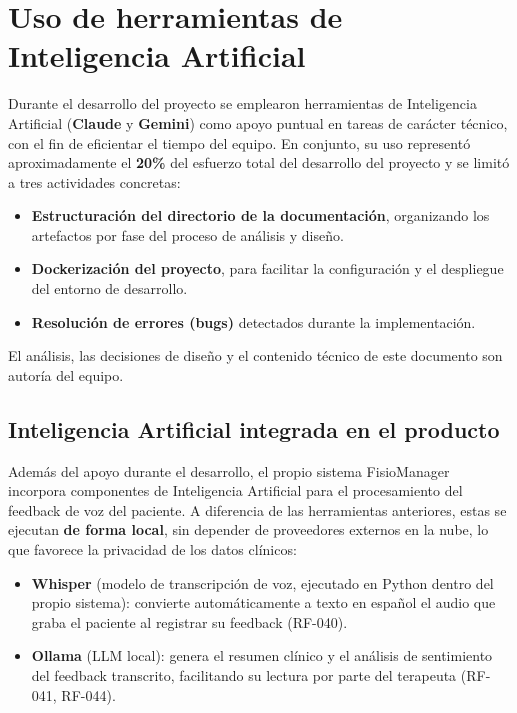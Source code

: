 \section{Uso de herramientas de Inteligencia Artificial}

Durante el desarrollo del proyecto se emplearon herramientas de Inteligencia Artificial (\textbf{Claude} y \textbf{Gemini}) como apoyo puntual en tareas de carácter técnico, con el fin de eficientar el tiempo del equipo. En conjunto, su uso representó aproximadamente el \textbf{20\%} del esfuerzo total del desarrollo del proyecto y se limitó a tres actividades concretas:

\begin{itemize}
  \item \textbf{Estructuración del directorio de la documentación}, organizando los artefactos por fase del proceso de análisis y diseño.
  \item \textbf{Dockerización del proyecto}, para facilitar la configuración y el despliegue del entorno de desarrollo.
  \item \textbf{Resolución de errores (bugs)} detectados durante la implementación.
\end{itemize}

\noindent El análisis, las decisiones de diseño y el contenido técnico de este documento son autoría del equipo.

\subsection{Inteligencia Artificial integrada en el producto}

Además del apoyo durante el desarrollo, el propio sistema FisioManager incorpora componentes de Inteligencia Artificial para el procesamiento del feedback de voz del paciente. A diferencia de las herramientas anteriores, estas se ejecutan \textbf{de forma local}, sin depender de proveedores externos en la nube, lo que favorece la privacidad de los datos clínicos:

\begin{itemize}
  \item \textbf{Whisper} (modelo de transcripción de voz, ejecutado en Python dentro del propio sistema): convierte automáticamente a texto en español el audio que graba el paciente al registrar su feedback (RF-040).
  \item \textbf{Ollama} (LLM local): genera el resumen clínico y el análisis de sentimiento del feedback transcrito, facilitando su lectura por parte del terapeuta (RF-041, RF-044).
\end{itemize}

